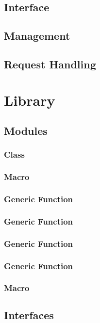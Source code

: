 \subsection{Interface}\label{sec:ser interface}
\subsection{Management}\label{sec:ser management}
\subsection{Request Handling}\label{sec:ser request handling}
\newpage
\section{Library}\label{sec:library}
\subsection{Modules}\label{sec:lib modules}
\subsubsection{Class }
\subsubsection{Macro }
\subsubsection{Generic Function }
\subsubsection{Generic Function }
\subsubsection{Generic Function }
\subsubsection{Generic Function }
\subsubsection{Macro }
\newpage
\subsection{Interfaces}\label{sec:lib interfaces}
